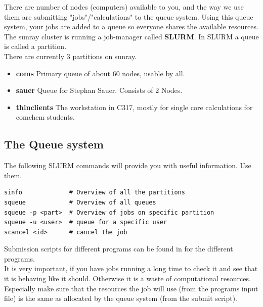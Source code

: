 \documentclass{article}
\begin{document}
There are number of nodes (computers) available to you, and the way we use them are submitting "jobs"/"calculations" to the queue system.
%
Using this queue system, your jobs are added to a queue so everyone shares the available resources.
The sunray cluster is running a job-manager called {\bf SLURM}.
In SLURM a queue is called a partition.\\

There are currently 3 partitions on sunray.

\begin{itemize}
    \item {\bf coms} Primary queue of about 60 nodes, usable by all. \newline

    \item {\bf sauer} Queue for Stephan Sauer. Consists of 2 Nodes. \newline

    \item {\bf thinclients} The workstation in C317, mostly for single core calculations for comchem students.

\end{itemize}

\subsection*{The Queue system}

The following SLURM commands will provide you with useful information. Use them.

\begin{lstlisting}
sinfo             # Overview of all the partitions
squeue            # Overview of all queues
squeue -p <part>  # Overview of jobs on specific partition
squeue -u <user>  # queue for a specific user
scancel <id>      # cancel the job
\end{lstlisting}

Submission scripts for different programs can be found in  for the different programs.\\

It is very important, if you have jobs running a long time to check it and see that it is behaving like it should. Otherwise it is a waste of computational resources.
Especially make sure that the resources the job will use (from the programs input file) is the same as allocated by the queue system (from the submit script).\\
\end{document}
